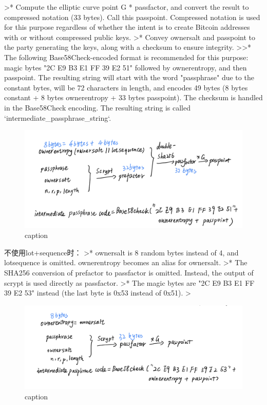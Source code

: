 \documentclass{article}
\begin{document}
>* Compute the elliptic curve point G * passfactor, and convert the result to compressed notation (33 bytes). Call this passpoint. Compressed notation is used for this purpose regardless of whether the intent is to create Bitcoin addresses with or without compressed public keys.
>* Convey ownersalt and passpoint to the party generating the keys, along with a checksum to ensure integrity.    
>>* The following Base58Check-encoded format is recommended for this purpose: magic bytes "2C E9 B3 E1 FF 39 E2 51" followed by ownerentropy, and then passpoint. The resulting string will start with the word "passphrase" due to the constant bytes, will be 72 characters in length, and encodes 49 bytes (8 bytes constant + 8 bytes ownerentropy + 33 bytes passpoint). The checksum is handled in the Base58Check encoding. The resulting string is called `intermediate_passphrase_string`.

\begin{figure}[h]
\centering
\includegraphics[width=.7\textwidth]{./im-code1.png}
\caption{caption}\label{fig-parsesig}
\end{figure}

不使用lot+sequence时：
>* ownersalt is 8 random bytes instead of 4, and lotsequence is omitted. ownerentropy becomes an alias for ownersalt.
>* The SHA256 conversion of prefactor to passfactor is omitted. Instead, the output of scrypt is used directly as passfactor.
>* The magic bytes are "2C E9 B3 E1 FF 39 E2 53" instead (the last byte is 0x53 instead of 0x51).
>


\begin{figure}[h]
\centering
\includegraphics[width=.7\textwidth]{./im-code2.png}
\caption{caption}\label{fig-parsesig}
\end{figure}
\end{document}
